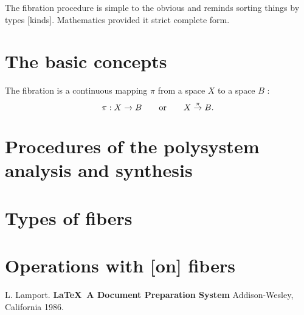 \documentclass[12pt,leqno]{book}
\begin{document}
The fibration procedure is simple to the obvious and reminds sorting things by types [kinds]. Mathematics provided it strict complete form.

\section{The basic concepts}

The fibration is a continuous mapping $\pi{}$ from a space $X$ to a space $B$ \cite{b335}:
\begin{equation}
\pi{}:X\to{}B\qquad{}\text{or}\qquad{}X\overset{\small{}\pi}{\to} B. \label{f:1}
\end{equation}

\section{Procedures of the polysystem analysis and synthesis}
\section{Types of fibers}
\section{Operations with [on] fibers}

\pagestyle{headings}




\begin{thebibliography}{99}
 L. Lamport. {\bf \LaTeX \ A Document Preparation System}
Addison-Wesley, California 1986.
\end{thebibliography}
\listoffigures
\listoftables

\end{document}

